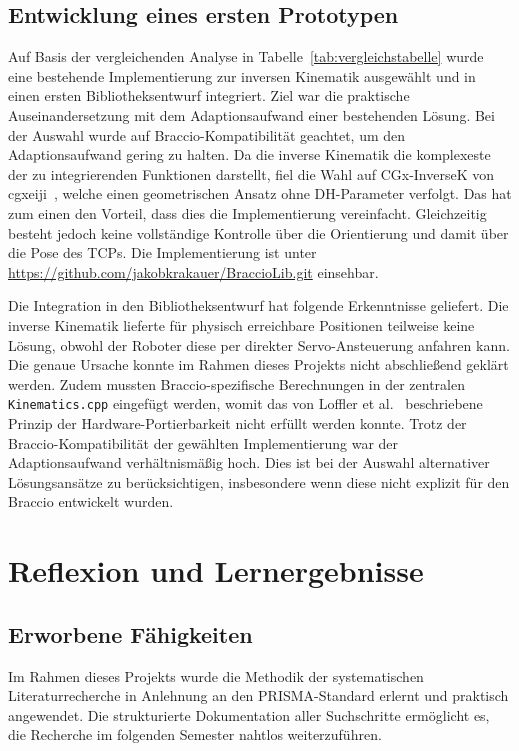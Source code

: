 \documentclass[12pt,a4paper]{article}
\begin{document}
\subsection{Entwicklung eines ersten Prototypen}
\label{sec:prototyp}

Auf Basis der vergleichenden Analyse in Tabelle~\ref{tab:vergleichstabelle} wurde eine bestehende Implementierung zur inversen Kinematik ausgewählt und in einen ersten Bibliotheksentwurf integriert. Ziel war die praktische Auseinandersetzung mit dem Adaptionsaufwand einer bestehenden Lösung. Bei der Auswahl wurde auf Braccio-Kompatibilität geachtet, um den Adaptionsaufwand gering zu halten. Da die inverse Kinematik die komplexeste der zu integrierenden Funktionen darstellt, fiel die Wahl auf CGx-InverseK von cgxeiji~\cite{cgxeiji.2020}, welche einen geometrischen Ansatz ohne DH-Parameter verfolgt. Das hat zum einen den Vorteil, dass dies die Implementierung vereinfacht. Gleichzeitig besteht jedoch keine vollständige Kontrolle über die Orientierung und damit über die Pose des TCPs. Die Implementierung ist unter \url{https://github.com/jakobkrakauer/BraccioLib.git} einsehbar.

Die Integration in den Bibliotheksentwurf hat folgende Erkenntnisse geliefert. Die inverse Kinematik lieferte für physisch erreichbare Positionen teilweise keine Lösung, obwohl der Roboter diese per direkter Servo-Ansteuerung anfahren kann. Die genaue Ursache konnte im Rahmen dieses Projekts nicht abschließend geklärt werden. Zudem mussten Braccio-spezifische Berechnungen in der zentralen \texttt{Kinematics.cpp} eingefügt werden, womit das von Loffler et al.~\cite{MarkusS.LofflerDarrenM.DawsonErkanZergerogluandNicolaeP.Costescu.} beschriebene Prinzip der Hardware-Portierbarkeit nicht erfüllt werden konnte. Trotz der Braccio-Kompatibilität der gewählten Implementierung war der Adaptionsaufwand verhältnismäßig hoch. Dies ist bei der Auswahl alternativer Lösungsansätze zu berücksichtigen, insbesondere wenn diese nicht explizit für den Braccio entwickelt wurden.


\newpage
\section{Reflexion und Lernergebnisse}
\subsection{Erworbene Fähigkeiten}

Im Rahmen dieses Projekts wurde die Methodik der systematischen Literaturrecherche in Anlehnung an den PRISMA-Standard erlernt und praktisch angewendet. Die strukturierte Dokumentation aller Suchschritte ermöglicht es, die Recherche im folgenden Semester nahtlos weiterzuführen. 
\end{document}
